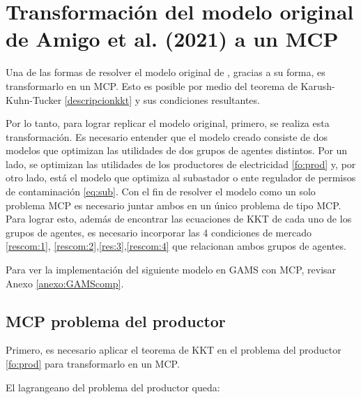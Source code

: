 \section{Transformación del modelo original de Amigo et al. (2021) a un MCP}

Una de las formas de resolver el modelo original de , gracias a su forma, es transformarlo en un MCP. Esto es posible por medio del teorema de Karush-Kuhn-Tucker \ref{descripcionkkt} y sus condiciones resultantes. 
\vspace{2.5mm}

Por lo tanto, para lograr replicar el modelo original, primero, se realiza esta transformación. Es necesario entender que el modelo creado consiste de dos modelos que optimizan las utilidades de dos grupos de agentes distintos. Por un lado, se optimizan las utilidades de los productores de electricidad \ref{fo:prod} y, por otro lado, está el modelo que optimiza al subastador o ente regulador de permisos de contaminación \ref{eq:sub}. Con el fin de resolver el modelo como un solo problema MCP es necesario juntar ambos en un único problema de tipo MCP. Para lograr esto, además de encontrar las ecuaciones de KKT de cada uno de los grupos de agentes, es necesario incorporar las 4 condiciones de mercado \ref{rescom:1}, \ref{rescom:2},\ref{res:3},\ref{rescom:4} que relacionan ambos grupos de agentes.

Para ver la implementación del siguiente modelo en GAMS con MCP, revisar Anexo \ref{anexo:GAMScomp}.

\subsection{MCP problema del productor}

Primero, es necesario aplicar el teorema de KKT en  el problema del productor \ref{fo:prod} para transformarlo en un MCP.
\vspace{2.5mm}

El lagrangeano del problema del productor queda: 


